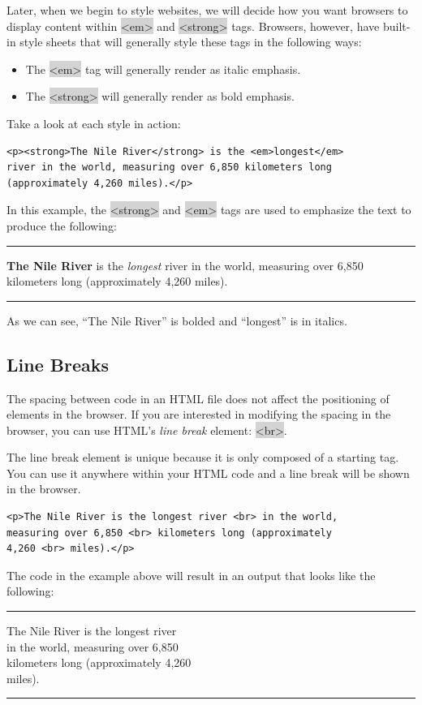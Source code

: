 \documentclass[11pt]{article}
\begin{document}
Later, when we begin to style websites, we will decide how you want browsers to display content within \colorbox{lightgray}{<em>} and \colorbox{lightgray}{<strong>} tags. Browsers, however, have built-in style sheets that will generally style these tags in the following ways:
\begin{itemize}[leftmargin = *]
\item The \colorbox{lightgray}{<em>} tag will generally render as italic emphasis.
\item The \colorbox{lightgray}{<strong>} will generally render as bold emphasis.
\end{itemize}
Take a look at each style in action:
\begin{lstlisting}
<p><strong>The Nile River</strong> is the <em>longest</em> 
river in the world, measuring over 6,850 kilometers long 
(approximately 4,260 miles).</p>
\end{lstlisting}
In this example, the \colorbox{lightgray}{<strong>} and \colorbox{lightgray}{<em>} tags are used to emphasize the text to produce the following:
\vspace{-3mm}
\par\noindent\rule{\textwidth}{0.2pt}
\textbf{The Nile River} is the \textit{longest} river in the world, measuring over 6,850 kilometers long (approximately 4,260 miles).
\vspace{-3mm}
\par\noindent\rule{\textwidth}{0.2pt}
As we can see, “The Nile River” is bolded and “longest” is in italics.

\subsection{Line Breaks}
The spacing between code in an HTML file does not affect the positioning of elements in the browser. If you are interested in modifying the spacing in the browser, you can use HTML’s \textit{line break} element: \colorbox{lightgray}{<br>}.

The line break element is unique because it is only composed of a starting tag. You can use it anywhere within your HTML code and a line break will be shown in the browser.
\begin{lstlisting}
<p>The Nile River is the longest river <br> in the world, 
measuring over 6,850 <br> kilometers long (approximately 
4,260 <br> miles).</p>
\end{lstlisting}
The code in the example above will result in an output that looks like the following:
\vspace{-3mm}
\par\noindent\rule{\textwidth}{0.2pt}
The Nile River is the longest river \\ 
in the world, measuring over 6,850 \\ 
kilometers long (approximately 4,260 \\
miles).
\vspace{-3mm}
\par\noindent\rule{\textwidth}{0.2pt}
\end{document}
